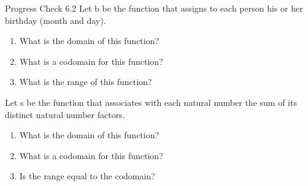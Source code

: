 \documentclass{beamer}
\begin{document}
\begin{frame}{Progress Check 6.2}
    Let b be the function that assigns to each person his or her birthday (month
and day).
\begin{enumerate}
    \item What is the domain of this function?
    \item What is a codomain for this function?
    \item What is the range of this function?
\end{enumerate}
Let s be the function that associates with each natural number the sum of its
distinct natural number factors.
\begin{enumerate}
    \item What is the domain of this function?
    \item What is a codomain for this function?
    \item Is the range equal to the codomain?
\end{enumerate}
\end{frame}
\end{document}
